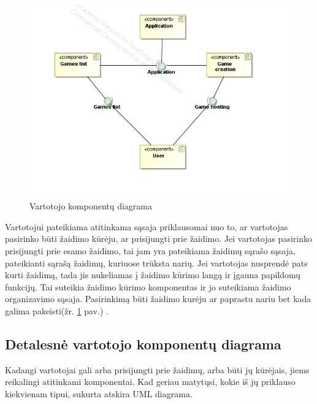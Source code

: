 \documentclass{VUMIFPSkursinis}
\begin{document}
		\begin{figure}[H]
			\centering
			\includegraphics[scale=0.6]{img/UMLComponent2}
			\caption{Vartotojo komponentų diagrama}
			\label{img:UMLComponent2}
		\end{figure}
		Vartotojui pateikiama atitinkama sąsaja priklausomai nuo to, ar vartotojas pasirinko būti žaidimo kūrėju, ar prisijungti prie žaidimo. Jei vartotojas pasirinko prisijungti prie esamo žaidimo, tai jam yra pateikiama žaidimų sąrašo sąsaja, pateikianti sąrašą žaidimų, kuriuose trūksta narių. Jei vartotojas nusprendė pats kurti žaidimą, tada jis nukeliamas į žaidimo kūrimo langą ir įgauna papildomų funkcijų. Tai suteikia žaidimo kūrimo komponentas ir jo suteikiama žaidimo organizavimo sąsaja. Pasirinkimą būti žaidimo kurėju ar paprastu nariu bet kada galima pakeisti(žr. \ref{img:UMLComponent2} pav.) . 
		
		\subsection{Detalesnė vartotojo komponentų diagrama}
		Kadangi vartotojai gali arba prisijungti prie žaidimų, arba būti jų kūrėjais, jiems reikalingi atitinkami komponentai. Kad geriau matytųsi, kokie iš jų priklauso kiekvienam tipui, sukurta atskira UML diagrama.
		
\end{document}
